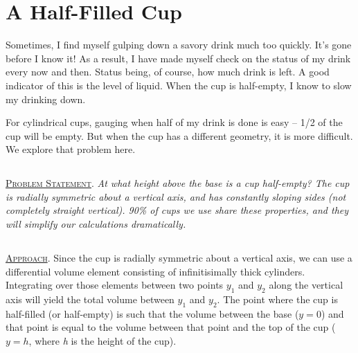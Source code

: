 \documentclass[11pt]{article}
\begin{document}
\section{A Half-Filled Cup}
Sometimes, I find myself gulping down a savory drink much too quickly. It's gone before I know it! As a result, I have made myself check on the status of my drink every now and then. Status being, of course, how much drink is left. A good indicator of this is the level of liquid. When the cup is half-empty, I know to slow my drinking down.

\vspace{10pt} For cylindrical cups, gauging when half of my drink is done is easy -- 1/2 of the cup will be empty. But when the cup has a different geometry, it is more difficult. We explore that problem here.

\subsection[Problem Statement]{} \textsc{\underline{Problem Statement}}. \textit{At what height above the base is a cup half-empty? The cup is radially symmetric about a vertical axis, and has constantly sloping sides (not completely straight vertical). 90\% of cups we use share these properties, and they will simplify our calculations dramatically.}

\subsection[Approach]{} \textsc{\underline{Approach}}. Since the cup is radially symmetric about a vertical axis, we can use a differential volume element consisting of infinitisimally thick cylinders. Integrating over those elements between two points $y_1$ and $y_2$ along the vertical axis will yield the total volume between $y_1$ and $y_2$. The point where the cup is half-filled (or half-empty) is such that the volume between the base ($y=0$) and that point is equal to the volume between that point and the top of the cup ($y=h$, where \textit{h} is the height of the cup). 
\end{document}
